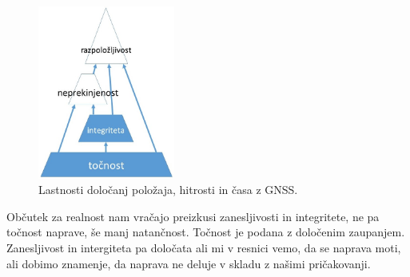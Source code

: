 \vspace{10pt}

\begin{figure}
	\vspace{-35pt}
	\begin{center}
		\includegraphics[width=0.4\textwidth]{Predavanja/05_SatLastPolozaj/figs/LastnostiGNSS.jpg}
	\end{center}
	\vspace{-15pt}
	\caption{Lastnosti določanj položaja, hitrosti in časa z GNSS.}
	\label{fig:Gnss_Polozaj:GnssLastnosti}
	\vspace{-10pt}
\end{figure}

\vspace{15pt}

 Občutek za realnost nam vračajo preizkusi zanesljivosti in integritete, ne pa točnost naprave, še manj natančnost. Točnost je podana z določenim zaupanjem. Zanesljivost in intergiteta pa določata ali mi v resnici vemo, da se naprava moti, ali dobimo znamenje, da naprava ne deluje v skladu z našimi pričakovanji.



